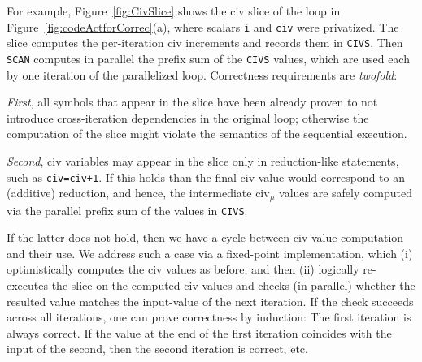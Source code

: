 \documentclass{sig-alternate}
\begin{document}
For example, Figure~\ref{fig:CivSlice} shows the {\sc civ} slice of the loop
in Figure~\ref{fig:codeActforCorrec}(a), where scalars {\tt i} and {\tt civ}
were privatized. The slice computes the per-iteration {\sc civ} increments 
and records them in {\tt CIVS}. Then {\tt SCAN}
computes in parallel the prefix sum of the {\tt CIVS} values, 
which are used each by one iteration of the parallelized loop.
%
Correctness requirements are {\em twofold}:  

{\em First}, all symbols that appear in the slice have been already proven 
to not introduce cross-iteration dependencies in the original loop; otherwise 
the computation of the slice might violate the semantics of the sequential execution. 

{\em Second}, {\sc civ} variables may appear in the slice only in reduction-like statements, 
such as {\tt civ=civ+1}.
If this holds than the final {\sc civ} value would correspond to an (additive) reduction, 
and hence, the intermediate {\sc civ}$_\mu$ values are safely computed via the parallel 
prefix sum of the values in {\tt CIVS}. 

If the latter does not hold, %
then we have a cycle between {\sc civ}-value computation and their use.   
We address such a case via a fixed-point implementation,
which (i) optimistically computes the {\sc civ} values as before, and then (ii) logically 
re-executes the slice on the computed-{\sc civ} values and checks (in parallel) 
whether the resulted value matches the input-value of the next iteration. 
%
If the check succeeds across all iterations, one can prove correctness by induction:
The first iteration is always correct. If the value at the end of the first iteration 
coincides with the input of the second, then the second iteration 
is correct, etc.%

\end{document}

